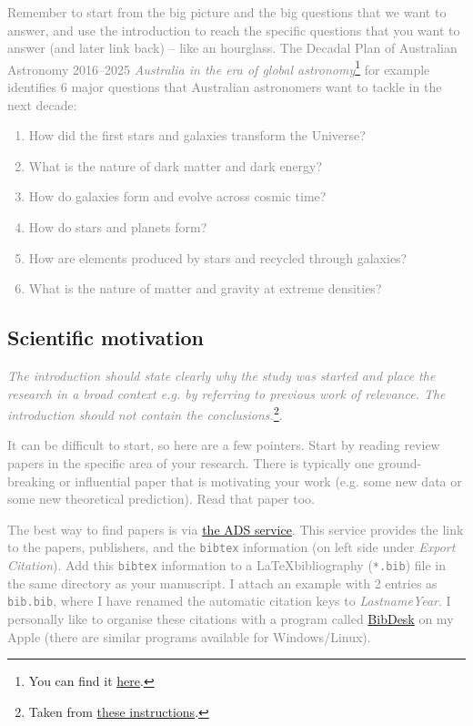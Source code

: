 \documentclass[
  journal=pasa,
  manuscript=Research-Article,
  year=2025,
  volume=X,
]{cup-journal}
\newcommand{\comment}[1]{\textcolor{gray}{#1}}
\begin{document}
\comment{Remember to start from the big picture and the big questions that we want to answer, and use the introduction to reach the specific questions that you want to answer (and later link back) -- like an hourglass. The Decadal Plan of Australian Astronomy 2016--2025 \textit{Australia in the era of global astronomy}\footnote{You can find it \href{https://www.science.org.au/supporting-science/science-sector-analysis/reports-and-publications/decadal-plan-australian-astronomy-2016-25}{here}.} for example identifies 6 major questions that Australian astronomers want to tackle in the next decade: 
\begin{enumerate}
    \item How did the first stars and galaxies transform the Universe?
    \item What is the nature of dark matter and dark energy?
    \item How do galaxies form and evolve across cosmic time?
    \item How do stars and planets form?
    \item How are elements produced by stars and recycled through galaxies?
    \item What is the nature of matter and gravity at extreme densities?
\end{enumerate}}

\subsection{Scientific motivation}

\comment{\textit{The introduction should state clearly why the study was started and place the research in a broad context e.g. by referring to previous work of relevance. The introduction should not contain the conclusions.}\footnote{Taken from \href{https://www.aanda.org/doc_journal/instructions/aadoc.pdf}{these instructions}.}.}

\comment{It can be difficult to start, so here are a few pointers. Start by reading review papers in the specific area of your research. There is typically one ground-breaking or influential paper that is motivating your work (e.g. some new data or some new theoretical prediction). Read that paper too.}

\comment{The best way to find papers is via \href{https://ui.adsabs.harvard.edu}{the ADS service}. This service provides the link to the papers, publishers, and the \texttt{bibtex} information (on left side under \textit{Export Citation}). Add this \texttt{bibtex} information to a \LaTeX bibliography (\texttt{*.bib}) file in the same directory as your manuscript. I attach an example with 2 entries as \texttt{bib.bib}, where I have renamed the automatic citation keys to \textit{LastnameYear}. I personally like to organise these citations with a program called \href{https://bibdesk.sourceforge.io}{BibDesk} on my Apple (there are similar programs available for Windows/Linux).}
\end{document}
